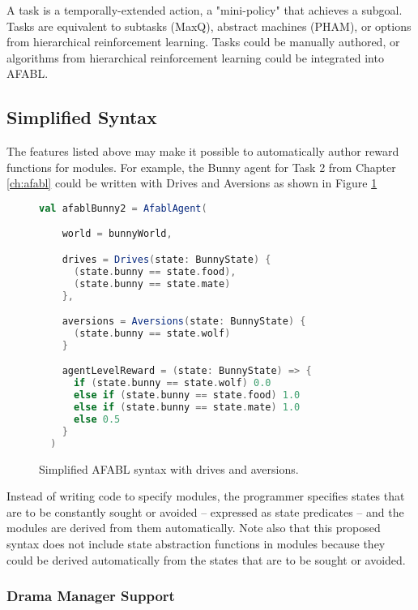 A task is a temporally-extended action, a "mini-policy" that achieves a subgoal.  Tasks are equivalent to subtasks (MaxQ), abstract machines (PHAM), or options from hierarchical reinforcement learning. Tasks could be manually authored, or algorithms from hierarchical reinforcement learning could be integrated into AFABL.

\subsection{Simplified Syntax}

The features listed above may make it possible to automatically author reward functions for modules. For example, the Bunny agent for Task 2 from Chapter \ref{ch:afabl} could be written with Drives and Aversions as shown in Figure \ref{fig:simplified-afabl}


\begin{figure}[!h]
\begin{center}

\begin{lstlisting}[language=Scala]
  val afablBunny2 = AfablAgent(

    world = bunnyWorld,

    drives = Drives(state: BunnyState) {
      (state.bunny == state.food),
      (state.bunny == state.mate)
    },

    aversions = Aversions(state: BunnyState) {
      (state.bunny == state.wolf)
    }

    agentLevelReward = (state: BunnyState) => {
      if (state.bunny == state.wolf) 0.0
      else if (state.bunny == state.food) 1.0
      else if (state.bunny == state.mate) 1.0
      else 0.5
    }
  )
\end{lstlisting}

\caption{Simplified AFABL syntax with drives and aversions.}
\end{center}
\label{fig:simplified-afabl}
\end{figure}


Instead of writing code to specify modules, the programmer specifies states that are to be constantly sought or avoided -- expressed as state predicates -- and the modules are derived from them automatically. Note also that this proposed syntax does not include state abstraction functions in modules because they could be derived automatically from the states that are to be sought or avoided.

\subsubsection{Drama Manager Support}

